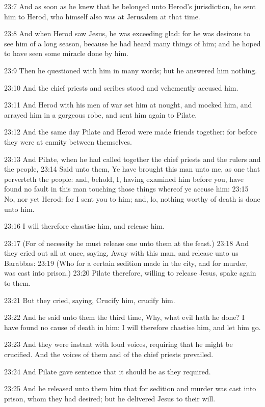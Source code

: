 23:7 And as soon as he knew that he belonged unto Herod's
jurisdiction, he sent him to Herod, who himself also was at Jerusalem
at that time.

23:8 And when Herod saw Jesus, he was exceeding glad: for he was
desirous to see him of a long season, because he had heard many things
of him; and he hoped to have seen some miracle done by him.

23:9 Then he questioned with him in many words; but he answered him
nothing.

23:10 And the chief priests and scribes stood and vehemently accused
him.

23:11 And Herod with his men of war set him at nought, and mocked him,
and arrayed him in a gorgeous robe, and sent him again to Pilate.

23:12 And the same day Pilate and Herod were made friends together:
for before they were at enmity between themselves.

23:13 And Pilate, when he had called together the chief priests and
the rulers and the people, 23:14 Said unto them, Ye have brought this
man unto me, as one that perverteth the people: and, behold, I, having
examined him before you, have found no fault in this man touching
those things whereof ye accuse him: 23:15 No, nor yet Herod: for I
sent you to him; and, lo, nothing worthy of death is done unto him.

23:16 I will therefore chastise him, and release him.

23:17 (For of necessity he must release one unto them at the feast.)
23:18 And they cried out all at once, saying, Away with this man, and
release unto us Barabbas: 23:19 (Who for a certain sedition made in
the city, and for murder, was cast into prison.)  23:20 Pilate
therefore, willing to release Jesus, spake again to them.

23:21 But they cried, saying, Crucify him, crucify him.

23:22 And he said unto them the third time, Why, what evil hath he
done? I have found no cause of death in him: I will therefore chastise
him, and let him go.

23:23 And they were instant with loud voices, requiring that he might
be crucified. And the voices of them and of the chief priests
prevailed.

23:24 And Pilate gave sentence that it should be as they required.

23:25 And he released unto them him that for sedition and murder was
cast into prison, whom they had desired; but he delivered Jesus to
their will.


